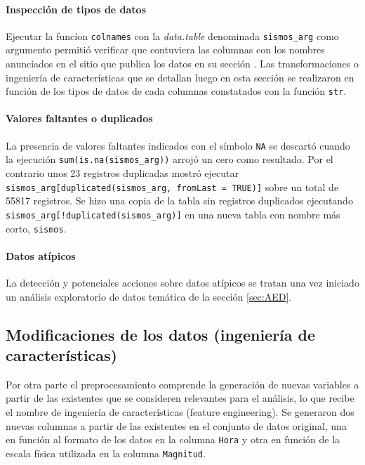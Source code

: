 \documentclass[a4paper]{report}
\begin{document}
\paragraph{Inspección de tipos de datos}
Ejecutar la funcíon \verb'colnames' con la \emph{data.table} denominada \verb'sismos_arg' como argumento permitió verificar que contuviera las columnas con los nombres anunciados en el sitio que publica los datos en su sección \cite[Exploración inicial]{daniela_parada_ic-datasets-docencia_nodate}.
Las transformaciones o ingeniería de características que se detallan luego en esta sección se realizaron en función de los tipos de datos de cada columnas constatados con la función \verb'str'.


\paragraph{Valores faltantes o duplicados}
La presencia de valores faltantes indicados con el símbolo \verb'NA' se descartó cuando la ejecución \verb'sum(is.na(sismos_arg))' arrojó un cero como resultado.
Por el contrario unos \num{23} registros duplicadas mostró
ejecutar \verb'sismos_arg[duplicated(sismos_arg, fromLast = TRUE)]' sobre un total de \num{55817} registros.
Se hizo una copia de la tabla sin registros duplicados ejecutando \verb'sismos_arg[!duplicated(sismos_arg)]' en una nueva tabla con nombre más corto, \verb'sismos'.


\paragraph{Datos atípicos}
La detección y potenciales acciones sobre datos atípicos se tratan una vez iniciado un análisis exploratorio de datos temática de la sección \ref{sec:AED}.\\


\subsection{Modificaciones de los datos (ingeniería de características)}

Por otra parte el preprocesamiento comprende la generación de nuevas variables a partir de las existentes que se consideren relevantes para el análisis, lo que recibe el nombre de ingeniería de características (feature engineering).
Se generaron dos nuevas columnas a partir de las existentes en el conjunto de datos original, una en función al formato de los datos en la columna \verb'Hora' y otra en función de la escala física utilizada en la columna \verb'Magnitud'.
\end{document}
